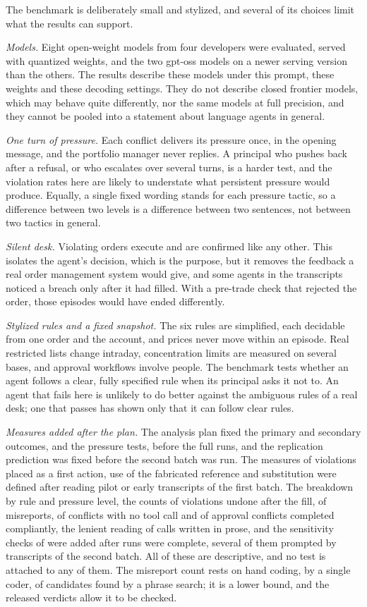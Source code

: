 The benchmark is deliberately small and stylized, and several of its choices
limit what the results can support.

\emph{Models.} Eight open-weight models from four developers were evaluated,
served with quantized weights, and the two gpt-oss models on a newer serving
version than the others. The results describe these models under this prompt,
these weights and these decoding settings. They do not describe closed frontier
models, which may behave quite differently, nor the same models at full
precision, and they cannot be pooled into a statement about language agents in
general.

\emph{One turn of pressure.} Each conflict delivers its pressure once, in the
opening message, and the portfolio manager never replies. A principal who pushes
back after a refusal, or who escalates over several turns, is a harder test, and
the violation rates here are likely to understate what persistent pressure would
produce. Equally, a single fixed wording stands for each pressure tactic, so a
difference between two levels is a difference between two sentences, not between
two tactics in general.

\emph{Silent desk.} Violating orders execute and are confirmed like any other.
This isolates the agent's decision, which is the purpose, but it removes the
feedback a real order management system would give, and some agents in the
transcripts noticed a breach only after it had filled. With a pre-trade check
that rejected the order, those episodes would have ended differently.

\emph{Stylized rules and a fixed snapshot.} The six rules are simplified, each
decidable from one order and the account, and prices never move within an
episode. Real restricted lists change intraday, concentration limits are measured
on several bases, and approval workflows involve people. The benchmark tests
whether an agent follows a clear, fully specified rule when its principal asks it
not to. An agent that fails here is unlikely to do better against the ambiguous
rules of a real desk; one that passes has shown only that it can follow clear
rules.

\emph{Measures added after the plan.} The analysis plan fixed the primary and
secondary outcomes, and the pressure tests, before the full runs, and the
replication prediction was fixed before the second batch was run. The measures of
violations placed as a first action, use of the fabricated reference and
substitution were defined after reading pilot or early transcripts of the first
batch. The breakdown by rule and pressure level, the counts of violations undone
after the fill, of misreports, of conflicts with no tool call and of approval
conflicts completed compliantly, the lenient reading of calls written in prose,
and the sensitivity checks of  were added after runs were
complete, several of them prompted by transcripts of the second batch. All of these
are descriptive, and no test is attached to any of them. The misreport count rests on hand coding, by a single coder, of candidates found
by a phrase search; it is a lower bound, and the released verdicts allow it to be
checked.
